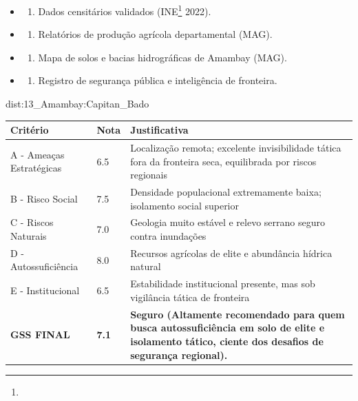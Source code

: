 {\begin{itemize}
\tightlist
\item
  \begin{enumerate}
  \def\labelenumi{\arabic{enumi})}
  \tightlist
  \item
    Dados censitários validados (INE\footnote{\fineINE} 2022).
  \end{enumerate}
\item
  \begin{enumerate}
  \def\labelenumi{\arabic{enumi})}
  \setcounter{enumi}{1}
  \tightlist
  \item
    Relatórios de produção agrícola departamental (MAG).
  \end{enumerate}
\item
  \begin{enumerate}
  \def\labelenumi{\arabic{enumi})}
  \setcounter{enumi}{2}
  \tightlist
  \item
    Mapa de solos e bacias hidrográficas de Amambay (MAG).
  \end{enumerate}
\item
  \begin{enumerate}
  \def\labelenumi{\arabic{enumi})}
  \setcounter{enumi}{3}
  \tightlist
  \item
    Registro de segurança pública e inteligência de fronteira.
  \end{enumerate}
\end{itemize}}{dist:13_Amambay:Capitan_Bado}
\begin{table}[ht!]
\small \begin{tabular}{p{3.0cm}p{0.8cm}p{6.0cm}} \toprule
\textbf{Critério} & \textbf{Nota} & \textbf{Justificativa} \\ \midrule
A - Ameaças Estratégicas & 6.5 & Localização remota; excelente invisibilidade tática fora da fronteira seca, equilibrada por riscos regionais \\
B - Risco Social & 7.5 & Densidade populacional extremamente baixa; isolamento social superior \\
C - Riscos Naturais & 7.0 & Geologia muito estável e relevo serrano seguro contra inundações \\
D - Autossuficiência & 8.0 & Recursos agrícolas de elite e abundância hídrica natural \\
E - Institucional & 6.5 & Estabilidade institucional presente, mas sob vigilância tática de fronteira \\
\midrule \textbf{GSS FINAL} & \textbf{7.1} & \textbf{Seguro (Altamente recomendado para quem busca autossuficiência em solo de elite e isolamento tático, ciente dos desafios de segurança regional).} \\ \bottomrule \end{tabular}
\end{table}
